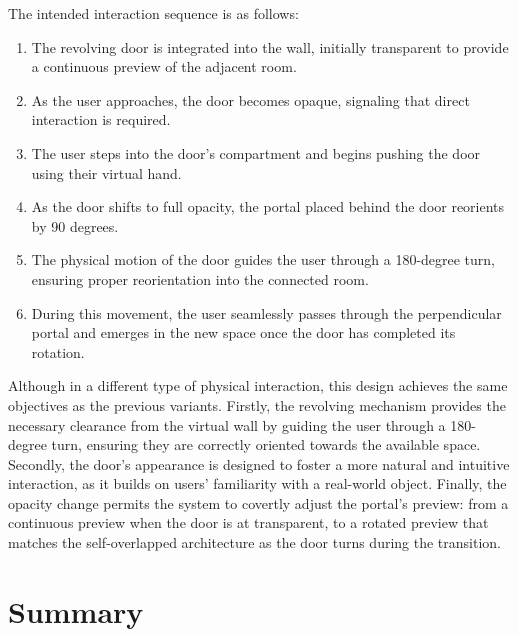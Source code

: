 The intended interaction sequence is as follows:

\begin{enumerate}
  \item The revolving door is integrated into the wall, initially transparent to provide a continuous preview of the adjacent room.  
  \item As the user approaches, the door becomes opaque, signaling that direct interaction is required.  
  \item The user steps into the door's compartment and begins pushing the door using their virtual hand.  
  \item As the door shifts to full opacity, the portal placed behind the door reorients by 90 degrees.  
  \item The physical motion of the door guides the user through a 180-degree turn, ensuring proper reorientation into the connected room.  
  \item During this movement, the user seamlessly passes through the perpendicular portal and emerges in the new space once the door has 
  completed its rotation.  
\end{enumerate}

Although in a different type of physical interaction, this design achieves the same objectives as the previous variants. 
Firstly, the revolving mechanism provides the necessary clearance from the virtual wall by guiding the user 
through a 180-degree turn, ensuring they are correctly oriented towards the available space. Secondly, the door's appearance is designed to 
foster a more natural and intuitive interaction, as it builds on users' familiarity with a real-world object. 
Finally, the opacity change permits the system to covertly adjust the 
portal's preview: from a continuous preview when the door is at transparent, to a rotated preview 
that matches the self-overlapped architecture as the door turns during the transition.


\section{Summary}
\label{sec:chap3-summary}

